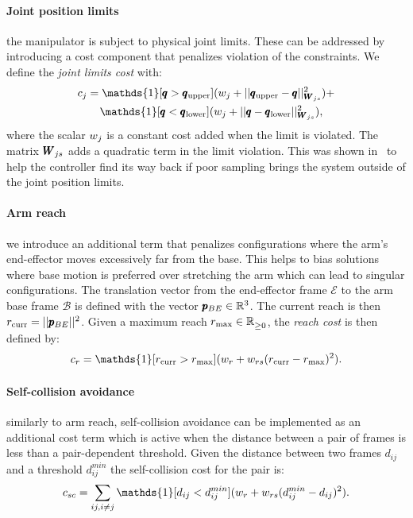  \paragraph{Joint position limits} the manipulator is subject to physical joint limits. These can be addressed by introducing a cost component that penalizes violation of the constraints. We define the \textit{joint limits cost} with:
 \begin{align}
     &c_{j} = \mathds{1}[\configRobot > \upperLimits](\weightScalar{j} + ||\upperLimits - \configRobot||^2_{\weightMatrix{js}}) + \nonumber\\ 
     &\qquad\mathds{1}[\configRobot < \lowerLimits](\weightScalar{j} +  || \configRobot - \lowerLimits||^2_{\weightMatrix{js}}), 
 \end{align}
 where the scalar $w_{j}$ is a constant cost added when the limit is violated. The matrix $\pmb{W}_{js}$ adds a quadratic term in the limit violation. This was shown in~\cite{williams_information-theoretic_2018} to help the controller find its way back if poor sampling brings the system outside of the joint position limits.
 
 \paragraph{Arm reach} we introduce an additional term that penalizes configurations where the arm's end-effector moves excessively far from the base. This helps to bias solutions where base motion is preferred over stretching the arm which can lead to singular configurations. The translation vector from the end-effector frame $\mathcal{E}$ to the arm base frame $\mathcal{B}$ is defined with the vector $\pmb{p}_{BE} \in \mathbb{R}^{3}$. The current reach is then $r_{\text{curr}} = || \pmb{p}_{BE} ||^2$. Given a maximum reach $r_{\text{max}} \in \mathbb{R}^{}_{\geq 0}$, the \textit{reach cost} is then defined by:
 \begin{equation}
   c_r = \mathds{1}[r_{\text{curr}} > r_{\text{max}}] (\weightScalar{r} + \weightScalar{rs}(r_{\text{curr}} - r_{\text{max}})^2).    
 \end{equation}

 \paragraph{Self-collision avoidance} similarly to arm reach, self-collision avoidance can be implemented as an additional cost term which is active when the distance between a pair of frames is less than a pair-dependent threshold. Given the distance between two frames $d_{ij}$ and a threshold $d^{min}_{ij}$ the self-collision cost for the pair is:
 \begin{equation}
   c_{sc} = \sum_{ij, i \neq j} \mathds{1}[d_{ij} < d^{min}_{ij}] (\weightScalar{r} + \weightScalar{rs}(d^{min}_{ij} - d_{ij})^2).    
 \end{equation}
 
